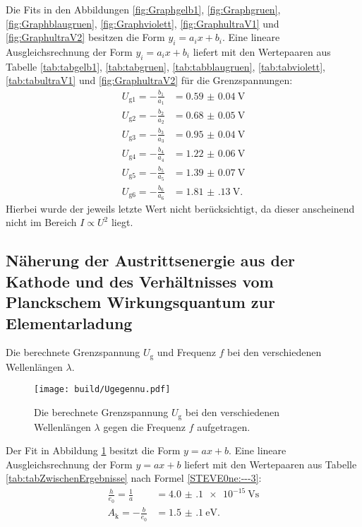 Die Fits in den Abbildungen \ref{fig:Graphgelb1}, \ref{fig:Graphgruen}, \ref{fig:Graphblaugruen}, \ref{fig:Graphviolett}, \ref{fig:GraphultraV1} und \ref{fig:GraphultraV2} besitzen die Form $y_i=a_i x + b_i$. Eine lineare Ausgleichsrechnung der Form $y_i=a_i x+b_i$ liefert mit den Wertepaaren aus Tabelle \ref{tab:tabgelb1}, \ref{tab:tabgruen}, \ref{tab:tabblaugruen}, \ref{tab:tabviolett}, \ref{tab:tabultraV1} und \ref{fig:GraphultraV2} für die Grenzspannungen:
\begin{align}
	U_{\text{g}1} = -\frac{b_1}{a_1} &= \SI{0.59(4)}{\volt}\\
	U_{\text{g}2} = -\frac{b_2}{a_2} &= \SI{0.68(5)}{\volt}\\
	U_{\text{g}3} = -\frac{b_3}{a_3} &= \SI{0.95(4)}{\volt}\\
	U_{\text{g}4} = -\frac{b_4}{a_4} &= \SI{1.22(6)}{\volt}\\
	U_{\text{g}5} = -\frac{b_5}{a_5} &= \SI{1.39(7)}{\volt}\\
	U_{\text{g}6} = -\frac{b_6}{a_6} &= \SI{1.81(13)}{\volt}\text{.}
\end{align}
Hierbei wurde der jeweils letzte Wert nicht berücksichtigt, da dieser anscheinend nicht im Bereich $I\propto U^2$ liegt.

\subsection{Näherung der Austrittsenergie aus der Kathode und des Verhältnisses vom Planckschem Wirkungsquantum zur Elementarladung}
\begin{table}
	\centering
	\caption{Die berechnete Grenzspannung $U_\text{g}$ und Frequenz $f$ bei den verschiedenen Wellenlängen $\lambda$.}
  	
\end{table}
\begin{figure}
	\centering
	\caption{Die berechnete Grenzspannung $U_\text{g}$ bei den verschiedenen Wellenlängen $\lambda$ gegen die Frequenz $f$ aufgetragen.}
	\texttt{[image: build/Ugegennu.pdf]}
	\label{fig:GraphUgegennu}
\end{figure}
Der Fit in Abbildung \ref{fig:GraphUgegennu} besitzt die Form $y=a x + b$. Eine lineare Ausgleichsrechnung der Form $y=a x + b$ liefert mit den Wertepaaren aus Tabelle \ref{tab:tabZwischenErgebnisse} nach Formel \eqref{STEVE0ne:---3}:
\begin{align}
	\frac{h}{e_0}=\frac{1}{a} &= \SI{4.0(1)e-15}{\volt\second}\\
	A_\text{k}=-\frac{b}{e_0} &= \SI{1.5(1)}{\electronvolt}\text{.}
\end{align}


